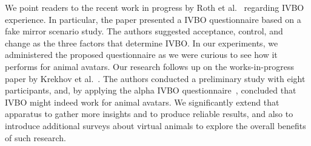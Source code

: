 \documentclass[conference]{IEEEtran}
\begin{document}

We point readers to the recent work in progress by Roth et al.~\cite{roth2017alpha} regarding IVBO experience. In particular, the paper presented a IVBO questionnaire based on a fake mirror scenario study. The authors suggested acceptance, control, and change as the three factors that determine IVBO. In our experiments, we administered the proposed questionnaire as we were curious to see how it performs for animal avatars. Our research follows up on the works-in-progress paper by Krekhov et al.~\cite{krekhov2018anim}. The authors conducted a preliminary study with eight participants, and, by applying the alpha IVBO questionnaire~\cite{roth2017alpha}, concluded that IVBO might indeed work for animal avatars. We significantly extend that apparatus to gather more insights and to produce reliable results, and also to introduce additional surveys about virtual animals to explore the overall benefits of such research.

\end{document}
